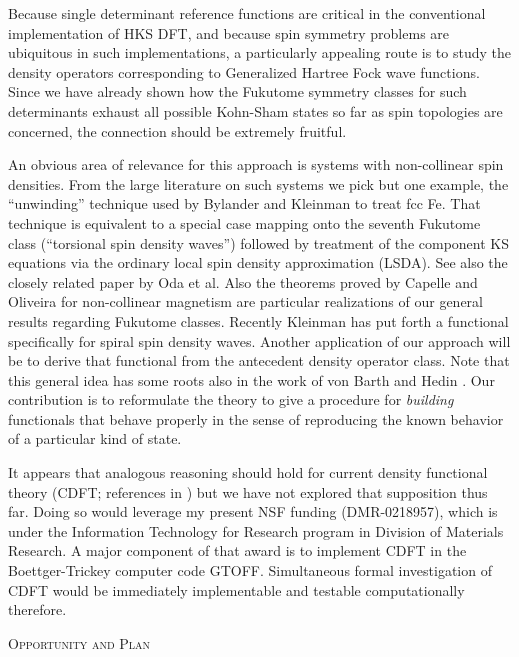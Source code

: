 \documentclass[nofootinbib,floatfix,aps,pra,preprint]{revtex4}
\begin{document}
\textrm{Because single determinant reference functions are critical in the
conventional implementation of HKS DFT, and because spin symmetry problems
are ubiquitous in such implementations, a particularly appealing route is to
study the density operators corresponding to Generalized Hartree Fock wave
functions. Since we have already shown how the Fukutome symmetry classes 
\cite{Fukutome} for such determinants exhaust all possible Kohn-Sham states
so far as spin topologies are concerned, the connection should be extremely
fruitful. }

\textrm{An obvious area of relevance for this approach is systems with
non-collinear spin densities. From the large literature on such systems we
pick but one example, the ``unwinding'' technique used by Bylander and
Kleinman \cite{Kleinman98} to treat fcc Fe. That technique is equivalent to
a special case mapping onto the seventh Fukutome class (``torsional spin
density waves'') followed by treatment of the component KS equations via the
ordinary local spin density approximation (LSDA). See also the closely
related paper by Oda et al.\cite{Oda} Also the theorems proved by Capelle
and Oliveira \cite{Capelle00} for non-collinear magnetism are particular
realizations of our general results regarding Fukutome classes. Recently
Kleinman \cite{Kleinman99} has put forth a functional specifically for
spiral spin density waves. Another application of our approach will be to
derive that functional from the antecedent density operator class. Note that
this general idea has some roots also in the work of von Barth and Hedin 
\cite{vBH72}. Our contribution is to reformulate the theory to give a
procedure for \emph{building } functionals that behave properly in the sense
of reproducing the known behavior of a particular kind of state. }

\textrm{It appears that analogous reasoning should hold for current density
functional theory (CDFT; references in \cite{VignaleRasolt}) but we have not
explored that supposition thus far. Doing so would leverage my present NSF
funding (DMR-0218957), which is under the Information Technology for
Research program in Division of Materials Research. A major component of
that award is to implement CDFT in the Boettger-Trickey computer code GTOFF.
Simultaneous formal investigation of CDFT would be immediately implementable
and testable computationally therefore. }

\begin{center}
\textrm{\textsc{Opportunity and Plan} }
\end{center}
\end{document}
